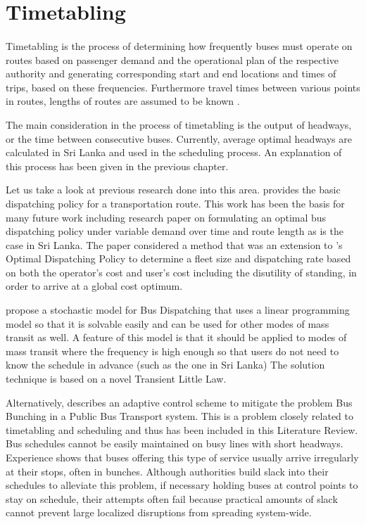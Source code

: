 \documentclass[12pt, oneside]{report}
\begin{document}
\section{Timetabling}

\paragraph{ } Timetabling is the process of determining how frequently buses must operate on routes based on passenger demand and the operational plan of the respective authority and generating corresponding start and end locations and times of trips, based on these frequencies. Furthermore travel times between various points in routes, lengths of routes are assumed to be known \citep{Huisman2004}.

The main consideration in the process of timetabling is the output of headways, or the time between consecutive buses. Currently, average optimal headways are calculated in Sri Lanka and used in the scheduling process. An explanation of this process has been given in the previous chapter.

Let us take a look at previous research done into this area. \citet{Newell1971} provides the basic dispatching policy for a transportation route. This work has been the basis for many future work including \citet{Kumarage2007} research paper on formulating an optimal bus dispatching policy under variable demand over time and route length as is the case in Sri Lanka. The paper considered a method that was an extension to \citet{Newell1971}'s Optimal Dispatching Policy to determine a fleet size and dispatching rate based on both the operator's cost and user's cost including the disutility of standing, in order to arrive at a global cost optimum.

\citet{Riano2004} propose a stochastic model for Bus Dispatching that uses a linear programming model so that it is solvable easily and can be used for other modes of mass transit as well. A feature of this model is that it should be applied to modes of mass transit where the frequency is high enough so that users do not need to know the
schedule in advance (such as the one in Sri Lanka) The solution technique is based on a novel Transient Little Law.

Alternatively, \citet{Daganzo2008} describes an adaptive control scheme to mitigate the problem Bus Bunching in a Public Bus Transport system. This is a problem closely related to timetabling and scheduling and thus has been included in this Literature Review. Bus schedules cannot be easily maintained on busy lines with short headways. Experience shows that buses offering this type of service usually arrive irregularly at their stops, often in bunches. Although authorities build slack into their schedules to alleviate this problem, if necessary holding buses at control points to stay on schedule, their attempts often fail because practical amounts of slack cannot prevent large localized disruptions from spreading system-wide. 
\end{document}
